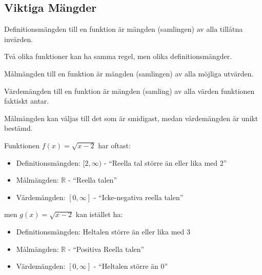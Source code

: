 \subsection{Viktiga Mängder} %

\begin{definition}[Definitionsmängd]
	Definitionsmängden till en funktion är mängden (samlingen) av alla tillåtna invärden.
\end{definition}

\begin{obs}
	Två olika funktioner kan ha samma regel, men olika definitionsmängder.
\end{obs}

\begin{definition}[Målmängd]
	Målmängden till en funktion är mängden (samlingen) av alla möjliga utvärden.
\end{definition}

\begin{definition}[Värdemängd]
	Värdemängden till en funktion är mängden (samling) av alla värden funktionen faktiskt antar.
\end{definition}

\begin{obs}
	Målmängden kan väljas till det som är smidigast, medan värdemängden är unikt bestämd.
\end{obs}


\begin{exempel}
	Funktionen \(f(x) = \sqrt{x-2}\) har oftast:
	\begin{itemize}
		\item Definitionsmängden: \([2, \infty)\) - ``Reella tal större än eller lika med 2''
		\item Målmängden: \(\mathbb{R}\) - ``Reella talen''
		\item Värdemängden: \([0, \infty ]\) - ``Icke-negativa reella talen''
	\end{itemize}
	men \(g(x) = \sqrt{x-2}\) kan istället ha:
	\begin{itemize}
		\item Definitionsmängden: Heltalen större än eller lika med 3
		\item Målmängden: \(\mathbb{R}\) - ``Positiva Reella talen''
		\item Värdemängden: \([0, \infty ]\) - ``Heltalen större än 0''
	\end{itemize}
	
\end{exempel}

